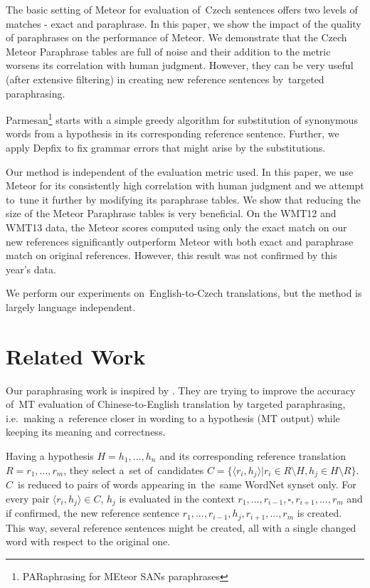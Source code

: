 The basic setting of Meteor for evaluation of~Czech sentences offers two levels of matches - exact 
and paraphrase. In this paper, we show the impact of the quality of paraphrases on the performance 
of Meteor. We demonstrate that the Czech Meteor Paraphrase tables are full of noise and their 
addition to the metric worsens its correlation with human judgment. However, they can be very useful
(after extensive filtering) in creating new reference sentences by~targeted paraphrasing.

Parmesan\footnote{PARaphrasing for MEteor SANs paraphrases} starts with a simple greedy algorithm for 
substitution of synonymous words from a hypothesis in its corresponding reference sentence. Further, 
we apply Depfix \cite{depfix} to fix grammar errors that might arise by the substitutions.

Our method is independent of the evaluation metric used. %
In this paper, we use Meteor for its consistently high correlation with human judgment and we 
attempt to~tune it further by modifying its paraphrase tables. We show 
that reducing the size of the Meteor Paraphrase tables is very beneficial. On the WMT12 and WMT13 data,
the Meteor scores computed using only the exact match on our new references significantly outperform Meteor 
with both exact and paraphrase match on original references. However, this result was not confirmed by this 
year's data. %

We perform our experiments on~English-to-Czech translations, but the method is largely language independent.

\section{Related Work}
Our paraphrasing work is inspired by \cite{kauchak}.
They are trying to improve the accuracy of~MT evaluation of Chinese-to-English translation by targeted
paraphrasing, i.e.~making a~reference closer in wording to a hypothesis (MT output) while keeping its
meaning and correctness.

Having a hypothesis $ H = h_1,...,h_n $ and its corresponding reference translation $ R =r_1, ...,r_m $,
they select a~set of~candidates $ C = \lbrace \langle r_i,h_j \rangle  \vert r_i \in R \setminus H
 , h_j \in H \setminus R \rbrace $. 
$ C $~is reduced to pairs of words appearing in~the~same WordNet \cite{wordnet} synset only. For every pair 
$  \langle r_i,h_j \rangle \in C $, $ h_j $ is evaluated in the context $ r_1,...,r_{i-1},\square,r_{i+1},...,r_m $
and if confirmed, the new reference sentence $ r_1,...,r_{i-1},h_j,r_{i+1},...,r_m $ is created.
This way, several reference sentences might be created, all with a single changed word with respect
to the original one.

